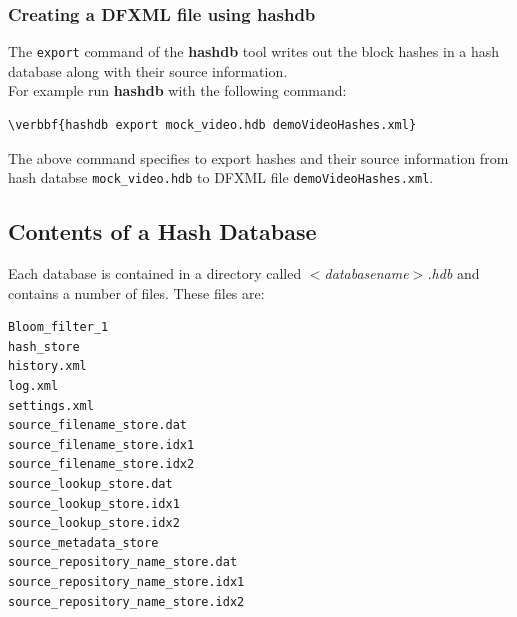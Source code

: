 \documentclass[11pt,fleqn]{article} %
\begin{document}
\subsubsection{Creating a DFXML file using \textbf{hashdb}}
The \texttt{export} command of the \textbf{hashdb} tool writes out the block hashes in a hash database along with their source information. \\

For example run \textbf{hashdb} with the following command:\\
\begin{Verbatim}[commandchars=\\\{\}]
\verbbf{hashdb export mock_video.hdb demoVideoHashes.xml}
\end{Verbatim}
The above command specifies to export hashes and their source information from hash databse \texttt{mock\_video.hdb} to DFXML file \texttt{demoVideoHashes.xml}.

\subsection{Contents of a Hash Database}
Each \hash database is contained in a directory called \textit{$<$databasename$>$.hdb} and contains a number of files. These files are:
\begin{verbatim}
Bloom_filter_1
hash_store
history.xml
log.xml
settings.xml
source_filename_store.dat
source_filename_store.idx1
source_filename_store.idx2
source_lookup_store.dat
source_lookup_store.idx1
source_lookup_store.idx2
source_metadata_store
source_repository_name_store.dat
source_repository_name_store.idx1
source_repository_name_store.idx2
\end{verbatim}
\end{document}
